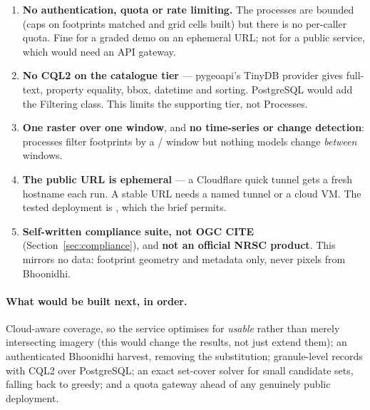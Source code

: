 \begin{enumerate}[leftmargin=1.8em,itemsep=0.7ex]
\item \textbf{No authentication, quota or rate limiting.} The processes are
bounded (caps on footprints matched and grid cells built) but there is no
per-caller quota. Fine for a graded demo on an ephemeral URL; not for a public
service, which would need an API gateway.

\item \textbf{No CQL2 on the catalogue tier} --- pygeoapi's TinyDB provider
gives full-text, property equality, bbox, datetime and sorting. PostgreSQL
would add the Filtering class. This limits the supporting tier, not Processes.

\item \textbf{One raster over one window}, and \textbf{no time-series or change
detection}: processes filter footprints by a / window but
nothing models change \emph{between} windows.

\item \textbf{The public URL is ephemeral} --- a Cloudflare quick tunnel gets a
fresh hostname each run. A stable URL needs a named tunnel or a cloud VM. The
tested deployment is , which the brief permits.

\item \textbf{Self-written compliance suite, not OGC CITE}
(Section~\ref{sec:compliance}), and \textbf{not an official NRSC product}. This
mirrors no data: footprint geometry and metadata only, never pixels from
Bhoonidhi.

\end{enumerate}

\paragraph{What would be built next, in order.} Cloud-aware coverage, so the
service optimises for \emph{usable} rather than merely intersecting imagery
(this would change the results, not just extend them); an authenticated
Bhoonidhi harvest, removing the substitution; granule-level records with CQL2
over PostgreSQL; an exact set-cover solver for small candidate sets, falling
back to greedy; and a quota gateway ahead of any genuinely public deployment.
